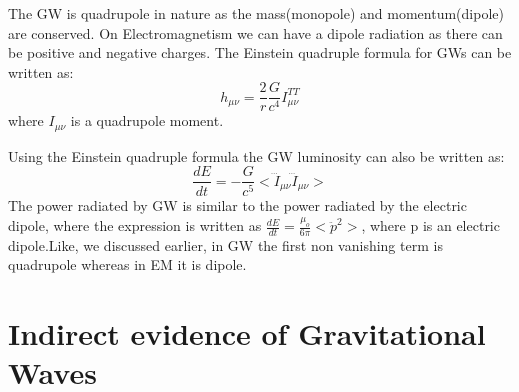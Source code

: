 \documentclass{ttuthes2007}
\begin{document}
	The \ac{GW} is quadrupole in nature as the mass(monopole) and
momentum(dipole) are conserved. On Electromagnetism we can have a dipole
radiation as there can be positive and negative charges.
The Einstein quadruple formula for \acp{GW} can be written as:
\begin{equation}
h_{\mu\nu}= \frac{2}{r}\frac{G}{c^4}I_{\mu\nu}^{TT}
\end{equation}
where $I_{\mu\nu}$ is a quadrupole moment.


Using the Einstein quadruple formula the \ac{GW} luminosity can also be written
as:
\begin{equation}
\frac{dE}{dt} = -\frac{G}{c^5}<\dddot{I}_{\mu\nu}\dddot{I}_{\mu\nu}>
\end{equation}
The power radiated by \ac{GW} is similar to the power radiated by the electric
dipole, where the expression is written as
$\frac{dE}{dt}=\frac{\mu_o}{6\pi}<\ddot{p}^2>$, where p is an electric
dipole.Like, we discussed earlier, in \ac{GW} the first non vanishing term is
quadrupole whereas in \acl{EM} it is dipole.

\section{Indirect evidence of Gravitational Waves}
	
\end{document}
